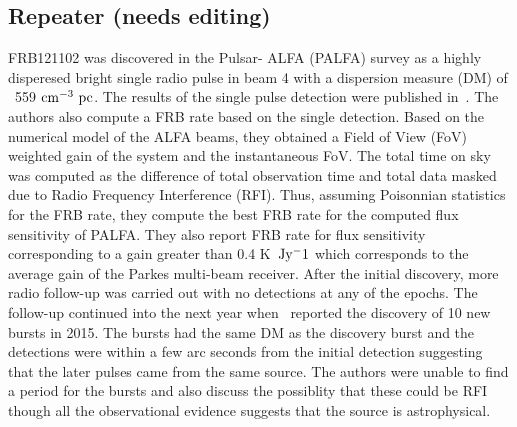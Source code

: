 \documentclass[a4paper,fleqn,usenatbib]{mnras}
\begin{document}
\subsection{Repeater (needs editing)}
FRB121102 was discovered in the Pulsar- ALFA (PALFA) survey as a highly
disperesed bright single radio pulse in beam 4 with a dispersion measure (DM) of ~559 $\rm cm^{-3}~pc$. The results of the single
pulse detection were published in~\cite{2014ApJ...790..101S}. The authors also compute a FRB rate based on the single detection. Based on the numerical model of
the ALFA beams, they obtained a Field of View (FoV) weighted gain of the 
system and the instantaneous FoV. The total time on sky was computed as the
difference of total observation time and total data masked due to Radio
Frequency Interference (RFI). Thus, assuming Poisonnian statistics for the FRB
rate, they compute the best FRB rate for the computed flux sensitivity of
PALFA. They also report FRB rate for flux sensitivity corresponding to a gain  
greater than 0.4 K~$\rm Jy^-1$ which corresponds to the average gain of the Parkes
multi-beam receiver. After the initial discovery, more radio follow-up was
carried out with no detections at any of the epochs. The follow-up continued
into the next year when~\cite{2016Natur.531..202S} reported the discovery of 10 new
bursts in 2015. The bursts had the same DM as the discovery burst and the 
detections were within a few arc seconds from the initial detection suggesting that the later pulses came from the same source. The authors were
unable to find a period for the bursts and also discuss the possiblity that
these could be RFI though all the observational evidence suggests that the source is
astrophysical.
\end{document}
